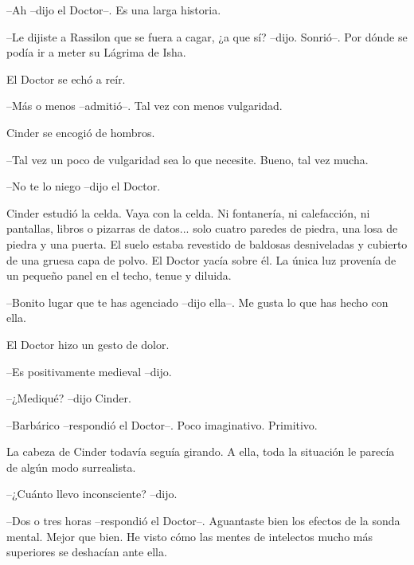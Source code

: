 --Ah --dijo el Doctor--. Es una larga historia.



--Le dijiste a Rassilon que se fuera a cagar, ¿a que sí? --dijo. Sonrió--. Por dónde se podía ir a meter su Lágrima de Isha.



El Doctor se echó a reír.



--Más o menos --admitió--. Tal vez con menos vulgaridad.



Cinder se encogió de hombros.



--Tal vez un poco de vulgaridad sea lo que necesite. Bueno, tal vez mucha.



--No te lo niego --dijo el Doctor.



Cinder estudió la celda. Vaya con la celda. Ni fontanería, ni calefacción, ni pantallas, libros o pizarras de datos... solo cuatro paredes de piedra, una losa de piedra y una puerta. El suelo estaba revestido de baldosas desniveladas y cubierto de una gruesa capa de polvo. El Doctor yacía sobre él. La única luz provenía de un pequeño panel en el techo, tenue y diluida. 



--Bonito lugar que te has agenciado --dijo ella--. Me gusta lo que has hecho con ella.



El Doctor hizo un gesto de dolor.



--Es positivamente medieval --dijo.



--¿Mediqué? --dijo Cinder.



--Barbárico --respondió el Doctor--. Poco imaginativo. Primitivo.



La cabeza de Cinder todavía seguía girando. A ella, toda la situación le parecía de algún modo surrealista.



--¿Cuánto llevo inconsciente? --dijo.



--Dos o tres horas --respondió el Doctor--. Aguantaste bien los efectos de la sonda mental. Mejor que bien. He visto cómo las mentes de intelectos mucho más superiores se deshacían ante ella.




